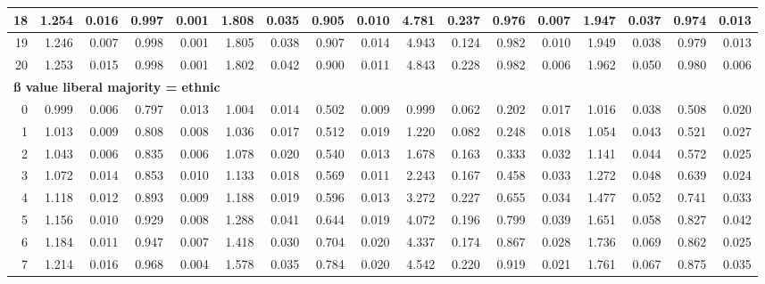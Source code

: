 \documentclass[
]{article}
\begin{document}
\begin{table}[H]
{\begin{tabular}[t]{r|r|r|r|r|r|r|r|r|r|r|r|r|r|r|r|r}
\hline
\hspace{1em}18 & 1.254 & 0.016 & 0.997 & 0.001 & 1.808 & 0.035 & 0.905 & 0.010 & 4.781 & 0.237 & 0.976 & 0.007 & 1.947 & 0.037 & 0.974 & 0.013\\
\hline
\hspace{1em}19 & 1.246 & 0.007 & 0.998 & 0.001 & 1.805 & 0.038 & 0.907 & 0.014 & 4.943 & 0.124 & 0.982 & 0.010 & 1.949 & 0.038 & 0.979 & 0.013\\
\hline
\hspace{1em}20 & 1.253 & 0.015 & 0.998 & 0.001 & 1.802 & 0.042 & 0.900 & 0.011 & 4.843 & 0.228 & 0.982 & 0.006 & 1.962 & 0.050 & 0.980 & 0.006\\
\hline
\multicolumn{17}{l}{\textbf{ß value liberal majority = ethnic}}\\
\hline
\hspace{1em}0 & 0.999 & 0.006 & 0.797 & 0.013 & 1.004 & 0.014 & 0.502 & 0.009 & 0.999 & 0.062 & 0.202 & 0.017 & 1.016 & 0.038 & 0.508 & 0.020\\
\hline
\hspace{1em}1 & 1.013 & 0.009 & 0.808 & 0.008 & 1.036 & 0.017 & 0.512 & 0.019 & 1.220 & 0.082 & 0.248 & 0.018 & 1.054 & 0.043 & 0.521 & 0.027\\
\hline
\hspace{1em}2 & 1.043 & 0.006 & 0.835 & 0.006 & 1.078 & 0.020 & 0.540 & 0.013 & 1.678 & 0.163 & 0.333 & 0.032 & 1.141 & 0.044 & 0.572 & 0.025\\
\hline
\hspace{1em}3 & 1.072 & 0.014 & 0.853 & 0.010 & 1.133 & 0.018 & 0.569 & 0.011 & 2.243 & 0.167 & 0.458 & 0.033 & 1.272 & 0.048 & 0.639 & 0.024\\
\hline
\hspace{1em}4 & 1.118 & 0.012 & 0.893 & 0.009 & 1.188 & 0.019 & 0.596 & 0.013 & 3.272 & 0.227 & 0.655 & 0.034 & 1.477 & 0.052 & 0.741 & 0.033\\
\hline
\hspace{1em}5 & 1.156 & 0.010 & 0.929 & 0.008 & 1.288 & 0.041 & 0.644 & 0.019 & 4.072 & 0.196 & 0.799 & 0.039 & 1.651 & 0.058 & 0.827 & 0.042\\
\hline
\hspace{1em}6 & 1.184 & 0.011 & 0.947 & 0.007 & 1.418 & 0.030 & 0.704 & 0.020 & 4.337 & 0.174 & 0.867 & 0.028 & 1.736 & 0.069 & 0.862 & 0.025\\
\hline
\hspace{1em}7 & 1.214 & 0.016 & 0.968 & 0.004 & 1.578 & 0.035 & 0.784 & 0.020 & 4.542 & 0.220 & 0.919 & 0.021 & 1.761 & 0.067 & 0.875 & 0.035\\

\end{tabular}}
\end{table}
\end{document}
